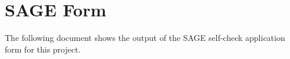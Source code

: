 \chapter{SAGE Form}
The following document shows the output of the SAGE self-check application form for this project.

